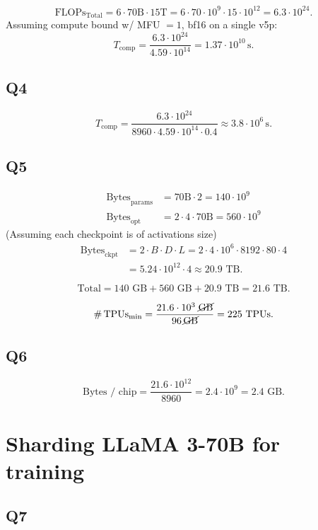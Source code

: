 \documentclass[11pt]{article}
\newcommand{\flops}{\text{FLOPs}}
\newcommand{\Tcomp}{T_{\text{comp}}}
\begin{document}
\[
\flops_{\text{Total}} = 6 \cdot 70\text{B} \cdot 15\text{T} = 6 \cdot 70 \cdot 10^9 \cdot 15 \cdot 10^{12} = 6.3 \cdot 10^{24}.
\]
Assuming compute bound w/ MFU $= 1$, bf16 on a single v5p:
\[
\Tcomp = \frac{6.3 \cdot 10^{24}}{4.59 \cdot 10^{14}} = 1.37 \cdot 10^{10}\,\text{s}.
\]

\subsection*{Q4}

\[
\Tcomp = \frac{6.3 \cdot 10^{24}}{8960 \cdot 4.59 \cdot 10^{14} \cdot 0.4} \approx 3.8 \cdot 10^6\,\text{s}.
\]

\subsection*{Q5}

\begin{align*}
\text{Bytes}_{\text{params}} &= 70\text{B} \cdot 2 = 140 \cdot 10^9 \\
\text{Bytes}_{\text{opt}}    &= 2 \cdot 4 \cdot 70\text{B} = 560 \cdot 10^9
\end{align*}
(Assuming each checkpoint is of activations size)
\begin{align*}
\text{Bytes}_{\text{ckpt}} &= 2 \cdot B \cdot D \cdot L = 2 \cdot 4 \cdot 10^6 \cdot 8192 \cdot 80 \cdot 4 \\
                            &= 5.24 \cdot 10^{12} \cdot 4 \approx 20.9\text{ TB.}
\end{align*}

\[
\text{Total} = 140\text{ GB} + 560\text{ GB} + 20.9\text{ TB} = 21.6\text{ TB.}
\]

\[
\#\,\text{TPUs}_{\min} = \frac{21.6 \cdot 10^3 \;\cancel{\text{GB}}}{96\,\cancel{\text{GB}}} = 225\text{ TPUs.}
\]

\subsection*{Q6}

\[
\text{Bytes / chip} = \frac{21.6 \cdot 10^{12}}{8960} = 2.4 \cdot 10^9 = 2.4\text{ GB.}
\]

\section*{Sharding LLaMA 3-70B for training}

\subsection*{Q7}
\end{document}
